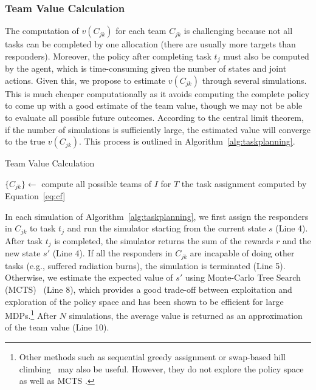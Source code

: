 \subsubsection{Team Value Calculation}
\noindent The computation of  $v(C_{jk})$ for each team
$C_{jk}$ is challenging because not all tasks can be completed by
one allocation (there are usually more targets than responders). Moreover, the policy after completing task $t_j$ must also be computed by the agent, which is time-consuming given the number of states and joint
actions. Given this, we propose to estimate $v(C_{jk})$ through
several simulations. This is much cheaper computationally as it avoids computing the complete policy to come up
with a good estimate of the team value, though we may not be able to
evaluate all possible future outcomes. According to the central
limit theorem, if the number of simulations is sufficiently
large, the estimated value will converge to the true $v(C_{jk})$.
This process is outlined in Algorithm~\ref{alg:taskplanning}.
\begin{algorithm}[htbp]
  \caption{Team Value Calculation}
  \label{alg:taskplanning}
  \Indm
  \Indp\BlankLine
  $\{ C_{jk} \} \gets$ compute all possible teams of $I$ for
  $T$ \;
  \Return the task assignment computed by Equation~\ref{eq:cf}
\end{algorithm}

In each simulation of Algorithm~\ref{alg:taskplanning}, we first
assign the responders in $C_{jk}$ to task $t_j$ and run the
simulator starting from the current state $s$ (Line 4). After task
$t_j$ is completed, the simulator returns the sum of the rewards
$r$ and the new state $s'$ (Line 4). If all the responders in
$C_{jk}$ are incapable of doing other tasks (e.g., suffered
radiation burns), the simulation is terminated (Line
5). Otherwise, we estimate the expected value of $s'$ using
Monte-Carlo Tree Search (MCTS)~\cite{kocsis2006bandit} (Line 8),
which provides a good trade-off between exploitation and exploration
of the policy space and has been shown to be efficient for large
MDPs.\footnote{Other methods such as sequential greedy assignment
or swap-based hill climbing~\cite{proper2009solving} may also be useful. However, they do not explore the policy space as well as MCTS \cite{kocsis2006bandit}.} After $N$ simulations, the average value is returned as an approximation of
the team value (Line 10).

